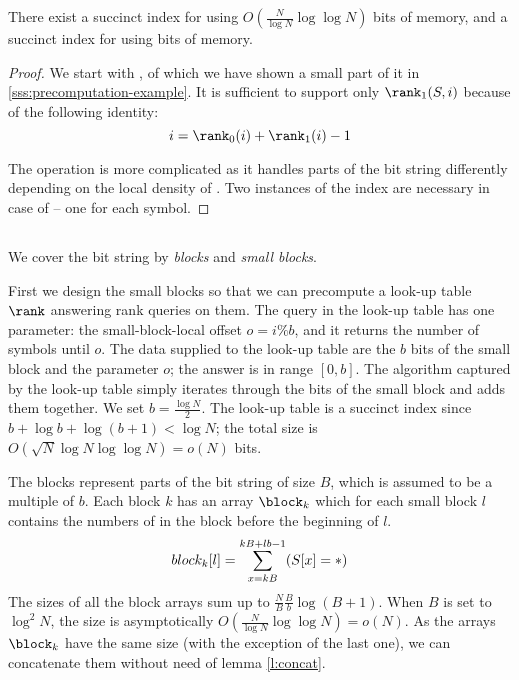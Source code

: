 \begin{thm}
	There exist a succinct index for \rank{} using $O(\frac{N}{\log N} \log \log N)$ bits of memory, and a succinct index for \select{} using  bits of memory.
\end{thm}
\begin{proof}
We start with \rank{}, of which we have shown a small part of it in \ref{sss:precomputation-example}.
It is sufficient to support only $\rank_1(S, i)$ because of the following identity:
$$ i = \rank_0(i) + \rank_1(i) - 1 $$

The operation \select{} is more complicated as it handles parts of the bit string differently depending on the local density of \ph.
Two instances of the index are necessary in case of \select{} -- one for each symbol.
\end{proof}

\subsection{\rank}\label{ss:rank}


We cover the bit string by \emph{blocks} and \emph{small blocks}.

First we design the small blocks so that we can precompute a look-up table $\rank$ answering rank queries on them.
The query in the look-up table has one parameter: the small-block-local offset $o = i \% b$, and it returns the number of symbols \ph{} until $o$.
The data supplied to the look-up table are the $b$ bits of the small block and the parameter $o$; the answer is in range $[0, b]$.
The algorithm captured by the look-up table simply iterates through the bits of the small block and adds them together.
We set $b = \frac{\log N}{2}$.
The look-up table is a succinct index since $b + \log b + \log (b + 1) < \log N$; the total size is $O(\sqrt{N} \log N \log \log N) = o(N)$ bits.

The blocks represent parts of the bit string of size $B$, which is assumed to be a multiple of $b$.
Each block $k$ has an array $\block_k$ which for each small block $l$ contains the numbers of \ph{} in the block before the beginning of $l$.
$$ block_k[l] = \sum_{x = k B}^{k B + l b - 1} (S[x] = \ph) $$
The sizes of all the block arrays sum up to $\frac{N}{B} \frac{B}{b} \log (B + 1)$.
When $B$ is set to $\log^2 N$, the size is asymptotically $O(\frac{N}{\log N} \log \log N) = o(N)$.
As the arrays $\block_k$ have the same size (with the exception of the last one), we can concatenate them without need of lemma \ref{l:concat}.

